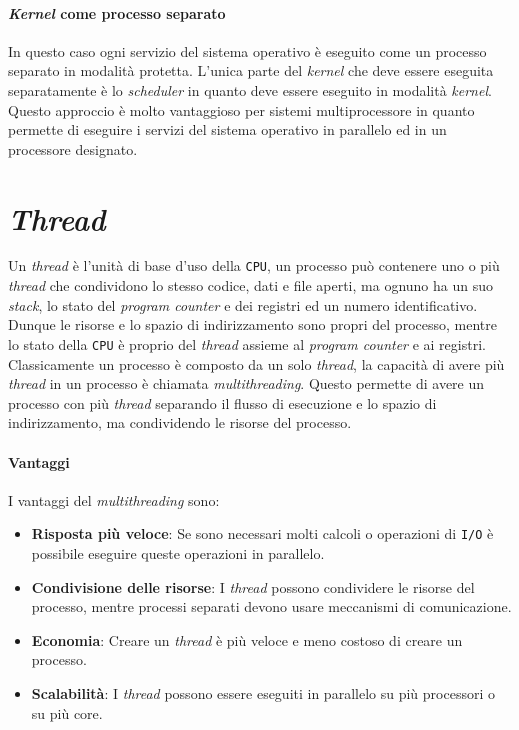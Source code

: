         \paragraph{\textit{Kernel} come processo separato} In questo caso ogni servizio del sistema operativo è eseguito come un processo separato in modalità protetta. L'unica parte del \textit{kernel} che deve essere eseguita separatamente è lo \textit{scheduler} in quanto deve essere eseguito in modalità \textit{kernel}. Questo approccio è molto vantaggioso per sistemi multiprocessore in quanto permette di eseguire i servizi del sistema operativo in parallelo ed in un processore designato.
\section{\textit{Thread}}
    Un \textit{thread} è l'unità di base d'uso della \texttt{CPU}, un processo può contenere uno o più \textit{thread} che condividono lo stesso codice, dati e file aperti, ma ognuno ha un suo \textit{stack}, lo stato del \textit{program counter} e dei registri ed un numero identificativo.\newline
    Dunque le risorse e lo spazio di indirizzamento sono propri del processo, mentre lo stato della \texttt{CPU} è proprio del \textit{thread} assieme al \textit{program counter} e ai registri.\newline
    Classicamente un processo è composto da un solo \textit{thread}, la capacità di avere più \textit{thread} in un processo è chiamata \textit{multithreading}. Questo permette di avere un processo con più \textit{thread} separando il flusso di esecuzione e lo spazio di indirizzamento, ma condividendo le risorse del processo. 
    \paragraph{Vantaggi}
        I vantaggi del \textit{multithreading} sono:
        \begin{itemize}
            \item \textbf{Risposta più veloce}: Se sono necessari molti calcoli o operazioni di \texttt{I/O} è possibile eseguire queste operazioni in parallelo.
            \item \textbf{Condivisione delle risorse}: I \textit{thread} possono condividere le risorse del processo, mentre processi separati devono usare meccanismi di comunicazione.
            \item \textbf{Economia}: Creare un \textit{thread} è più veloce e meno costoso di creare un processo.
            \item \textbf{Scalabilità}: I \textit{thread} possono essere eseguiti in parallelo su più processori o su più core.
        \end{itemize}
